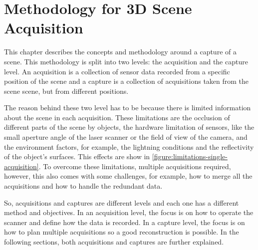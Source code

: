 \chapter{Methodology for 3D Scene Acquisition}
\label{chapter:scene_capture_methodology}

This chapter describes the concepts and methodology around a capture of a scene. This methodology is split into two levels: the acquisition and the capture level. An acquisition is a collection of sensor data recorded from a specific position of the scene and a capture is a collection of acquisitions taken from the scene scene, but from different positions.

The reason behind these two level has to be because there is limited information about the scene in each acquisition. These limitations are the occlusion of different parts of the scene by objects, the hardware limitation of sensors, like the small aperture angle of the laser scanner or the field of view of the camera, and the environment factors, for example, the lightning conditions and the reflectivity of the object's surfaces. This effects are show in \cref{figure:limitations-single-acquisition}. To overcome these limitations, multiple acquisitions required, however, this also comes with some challenges, for example, how to merge all the acquisitions and how to handle the redundant data.

So, acquisitions and captures are different levels and each one has a different method and objectives. In an acquisition level, the focus is on how to operate the scanner and define how the data is recorded. In a capture level, the focus is on how to plan multiple acquisitions so a good reconstruction is possible. In the following sections, both acquisitions and captures are further explained.







